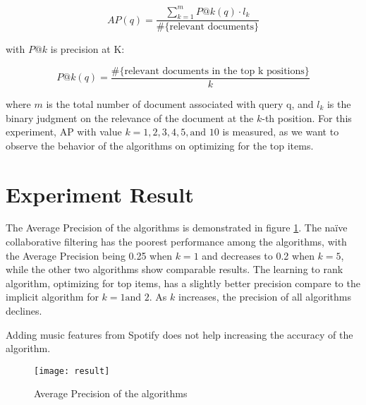 \begin{displaymath}
AP(q) = \frac{\sum_{k=1}^m P@k(q) \cdot l_k}{\#\text{\{relevant documents\}}}
\end{displaymath}

\noindent with \( P@k \) is precision at K:

\begin{displaymath}
P@k(q) = \frac{\#\text{\{relevant documents in the top k positions\}}}{k}
\end{displaymath}

\noindent where \(m\) is the total number of document associated with query q, and \(l_k\) is the binary judgment on the relevance of the document at the \(k\)-th position. For this experiment, AP with value \(k = 1, 2, 3, 4, 5, \text{and } 10\) is measured, as we want to observe the behavior of the algorithms on optimizing for the top items. 

\section{Experiment Result}
The Average Precision of the algorithms is demonstrated in figure \ref{AP_result}. The na\"ive collaborative filtering has the poorest performance among the algorithms, with the Average Precision being 0.25 when \(k = 1\) and decreases to 0.2 when \(k = 5\), while the other two algorithms show comparable results. The learning to rank algorithm, optimizing for top items, has a slightly better precision compare to the implicit algorithm for \(k = 1 \text{and } 2\). As \(k\) increases, the precision of all algorithms declines. 

\noindent Adding music features from Spotify does not help increasing the accuracy of the algorithm. 

\begin{figure}[h]
	\texttt{[image: result]}
	\centering
	\caption{Average Precision of the algorithms}
	\label{AP_result}
\end{figure}


